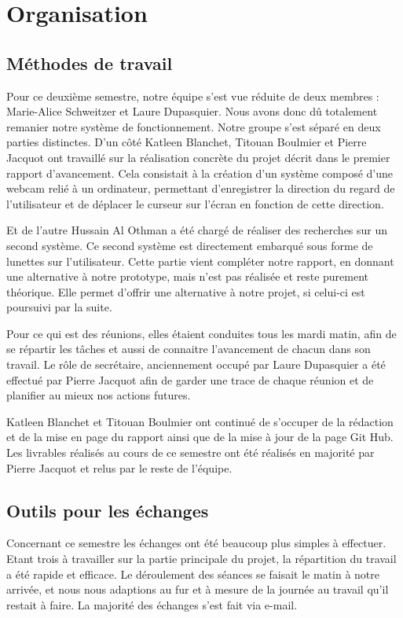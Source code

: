 \chapter{Organisation}

\section{Méthodes de travail}

Pour ce deuxième semestre, notre équipe s’est vue réduite de deux membres : Marie-Alice Schweitzer et Laure Dupasquier. Nous avons donc dû totalement remanier notre système de fonctionnement.
Notre groupe s'est séparé en deux parties distinctes. D’un côté Katleen Blanchet, Titouan Boulmier et Pierre Jacquot ont travaillé sur la réalisation concrète du projet décrit dans le premier rapport d’avancement. Cela consistait à la création d’un système composé d’une webcam relié à un ordinateur, permettant d’enregistrer la direction du regard de l’utilisateur et de déplacer le curseur sur l’écran en fonction de cette direction.

Et de l’autre Hussain Al Othman a été chargé de réaliser des recherches sur un second système. Ce second système est directement embarqué sous forme de lunettes sur l’utilisateur. Cette partie vient compléter notre rapport, en donnant une alternative à notre prototype, mais n'est pas réalisée et reste purement théorique. Elle permet d’offrir une alternative à notre projet, si celui-ci est poursuivi par la suite.

Pour ce qui est des réunions, elles étaient conduites tous les mardi matin, afin de se répartir les tâches et aussi de connaitre l’avancement de chacun dans son travail. Le rôle de secrétaire, anciennement occupé par Laure Dupasquier a été effectué par Pierre Jacquot afin de garder une trace de chaque réunion et de planifier au mieux nos actions futures.

Katleen Blanchet et Titouan Boulmier ont continué de s’occuper de la rédaction et de la mise en page du rapport ainsi que de la mise à jour de la page Git Hub.
Les livrables réalisés au cours de ce semestre ont été réalisés en majorité par Pierre Jacquot et relus par le reste de l’équipe.

\section{Outils pour les échanges}

Concernant ce semestre les échanges ont été beaucoup plus simples à effectuer. Etant trois à travailler sur la partie principale du projet, la répartition du travail a été rapide et efficace. Le déroulement des séances se faisait le matin à notre arrivée, et nous nous adaptions au fur et à mesure de la journée au travail qu’il restait à faire.
La majorité des échanges s'est fait via e-mail.
 
